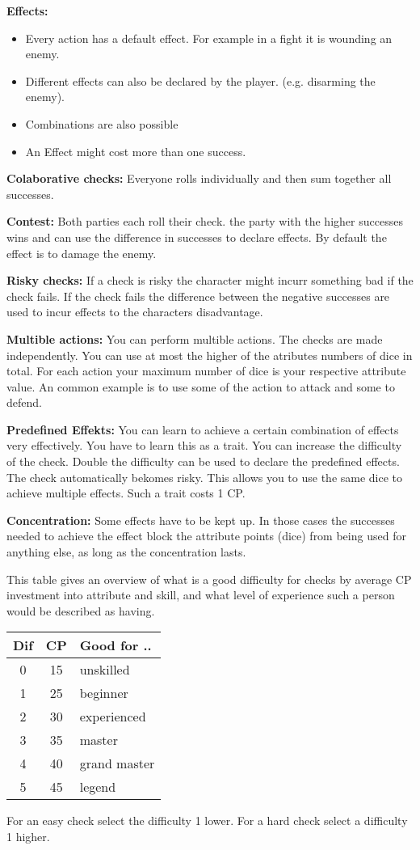 \documentclass[11pt]{article}
\begin{document}
{\begin{multicols}{2}[]
\textbf{Effects:}
\begin{itemize}
\item Every action has a default effect. For example in a fight it is wounding an enemy.
\item Different effects can also be declared by the player. (e.g. disarming the enemy).
\item Combinations are also possible
\item An Effect might cost more than one success.
\end{itemize}

\textbf{Colaborative checks:}
Everyone rolls individually and then sum together all successes.

\textbf{Contest:}
Both parties each roll their check. the party with the higher successes wins and can use the difference in successes to declare effects. By default the effect is to damage the enemy.

\textbf{Risky checks:}
If a check is risky the character might incurr something bad if the check fails. If the check fails the difference between the negative successes are used to incur effects to the characters disadvantage. 

\textbf{Multible actions:}
You can perform multible actions. The checks are made independently. You can use at most the higher of the atributes numbers of dice in total. For each action your maximum number of dice is your respective attribute value. An common example is to use some of the action to attack and some to defend.

\textbf{Predefined Effekts:}
You can learn to achieve a certain combination of effects very effectively. You have to learn this as a trait. You can increase the difficulty of the check. Double the difficulty can be used to declare the predefined effects. The check automatically bekomes risky. This allows you to use the same dice to achieve multiple effects. Such a trait costs 1 CP.

\textbf{Concentration:}
Some effects have to be kept up. In those cases the successes needed to achieve the effect block the attribute points (dice) from being used for anything else, as long as the concentration lasts. 


This table gives an overview of what is a good difficulty for checks by average CP investment into attribute and skill, and what level of experience such a person would be described as having.
\begin{center}
\begin{tabular}{c|c|l}
\textbf{Dif} & \textbf{CP} & \textbf{Good for ..}\\
\hline
0 & 15 & unskilled\\
1 & 25 & beginner\\
2 & 30 & experienced\\
3 & 35 & master\\
4 & 40 & grand master\\
5 & 45 & legend\\
\end{tabular}
\end{center}
For an easy check select the difficulty 1 lower. For a hard check select a difficulty 1 higher.


\end{multicols}}
\end{document}

